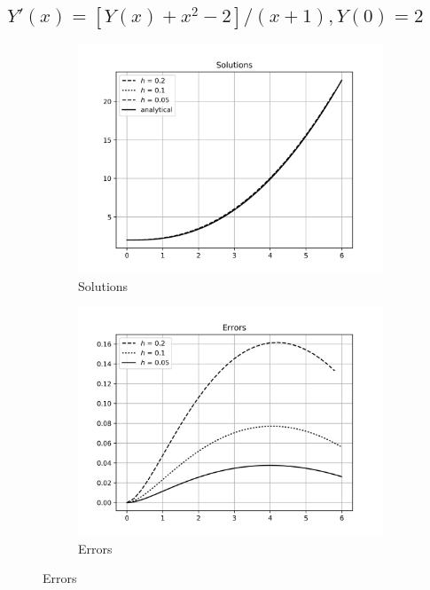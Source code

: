 \documentclass[12,a4paper]{article}
\begin{document}
    \subsection{$Y'(x) = [Y(x) + x^2 - 2]/(x+1),Y(0) = 2$}
    
    \begin{figure}[H]
        \centering
        \begin{subfigure}[t]{0.49\textwidth}
            \includegraphics[width = \textwidth]{plots/euler_2.png}
            \caption{Solutions}
            \label{fig:sol_e2}
        \end{subfigure}
        \begin{subfigure}[t]{0.49\textwidth}
            \includegraphics[width = \textwidth]{plots/euler_error_2.png}
            \caption{Errors}
            \label{fig:err_e2}
        \end{subfigure}
    \end{figure}
    
\end{document}
